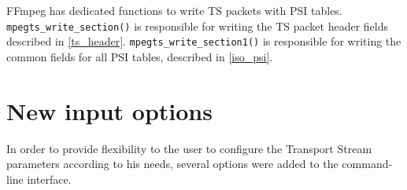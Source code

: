 \documentclass[
	12pt,				%
	openright,			%
	twoside,			%
	a4paper,			%
	brazil,
	french,				%
	english
	]{abntex2}
\begin{document}
FFmpeg has dedicated functions to write TS packets with PSI tables. \texttt{mpegts\hspace{0.1mm}\_\hspace{0.1mm}write\hspace{0.1mm}\_\hspace{0.1mm}section()} is responsible for writing the TS packet header fields described in \autoref{ts_header}. \texttt{mpegts\hspace{0.1mm}\_\hspace{0.1mm}write\hspace{0.1mm}\_\hspace{0.1mm}section1()} is responsible for writing the common fields for all PSI tables, described in \autoref{iso_psi}.





\section{New input options}
In order to provide flexibility to the user to configure the Transport Stream parameters according to his needs, several options were added to the command-line interface.
\end{document}
